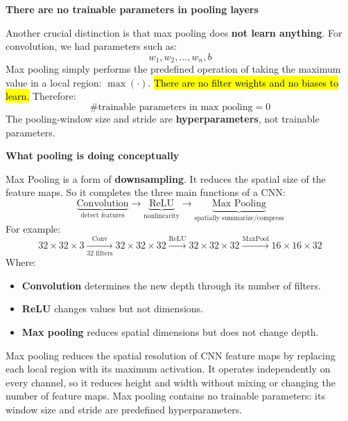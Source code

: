 \begin{flushleft}
    \textcolor{Red2}{ \textbf{There are no trainable parameters in pooling layers}}
\end{flushleft}
Another crucial distinction is that max pooling does \textbf{not learn anything}. For convolution, we had parameters such as:
\begin{equation*}
    w_1, w_2, \dots, w_{n}, b
\end{equation*}
Max pooling simply performs the predefined operation of taking the maximum value in a local region: $\max(\cdot)$. \hl{There are no filter weights and no biases to learn.} Therefore:
\begin{equation*}
    \text{\# trainable parameters in max pooling} = 0
\end{equation*}
The pooling-window size and stride are \textbf{hyperparameters}, not trainable parameters.

\highspace
\begin{flushleft}
    \textcolor{Green3}{ \textbf{What pooling is doing conceptually}}
\end{flushleft}
Max Pooling is a form of \textbf{downsampling}. It reduces the spatial size of the feature maps. So it completes the three main functions of a CNN:
\begin{equation*}
    \underbrace{\text{Convolution}}_{\text{detect features}} \to \underbrace{\text{ReLU}}_{\text{nonlinearity}} \to \underbrace{\text{Max Pooling}}_{\text{spatially summarize/compress}}
\end{equation*}
For example:
\begin{equation*}
    32 \times 32 \times 3 \xrightarrow[\text{32 filters}]{\text{Conv}} 32 \times 32 \times 32 \xrightarrow{\text{ReLU}} 32 \times 32 \times 32 \xrightarrow{\text{MaxPool}} 16 \times 16 \times 32
\end{equation*}
Where:
\begin{itemize}
    \item \textbf{Convolution} determines the new depth through its number of filters.
    \item \textbf{ReLU} changes values but not dimensions.
    \item \textbf{Max pooling} reduces spatial dimensions but does not change depth.
\end{itemize}

\highspace
\begin{takeawaysbox}
    Max pooling reduces the spatial resolution of CNN feature maps by replacing each local region with its maximum activation. It operates independently on every channel, so it reduces height and width without mixing or changing the number of feature maps. Max pooling contains no trainable parameters: its window size and stride are predefined hyperparameters.
\end{takeawaysbox}